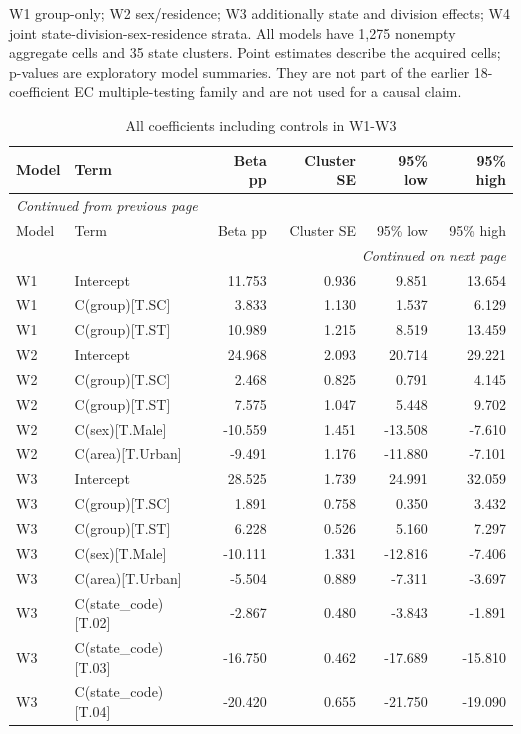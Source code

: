 \documentclass[11pt,a4paper]{report}
\begin{document}
W1 group-only; W2 sex/residence; W3 additionally state and division effects; W4 joint state-division-sex-residence strata. All models have 1,275 nonempty aggregate cells and 35 state clusters. Point estimates describe the acquired cells; p-values are exploratory model summaries. They are not part of the earlier 18-coefficient EC multiple-testing family and are not used for a causal claim.
\begingroup\footnotesize\setlength{\tabcolsep}{4pt}
\begin{longtable}{l>{\raggedright\arraybackslash}p{6cm}rrrr}
\caption{All coefficients including controls in W1-W3}\\\toprule
Model & Term & Beta pp & Cluster SE & 95\% low & 95\% high \\\midrule\endfirsthead
\multicolumn{6}{l}{\textit{Continued from previous page}}\\\toprule
Model & Term & Beta pp & Cluster SE & 95\% low & 95\% high \\\midrule\endhead
\midrule\multicolumn{6}{r}{\textit{Continued on next page}}\\\endfoot\bottomrule\endlastfoot
W1 & Intercept & 11.753 & 0.936 & 9.851 & 13.654 \\
W1 & C(group)[T.SC] & 3.833 & 1.130 & 1.537 & 6.129 \\
W1 & C(group)[T.ST] & 10.989 & 1.215 & 8.519 & 13.459 \\
W2 & Intercept & 24.968 & 2.093 & 20.714 & 29.221 \\
W2 & C(group)[T.SC] & 2.468 & 0.825 & 0.791 & 4.145 \\
W2 & C(group)[T.ST] & 7.575 & 1.047 & 5.448 & 9.702 \\
W2 & C(sex)[T.Male] & -10.559 & 1.451 & -13.508 & -7.610 \\
W2 & C(area)[T.Urban] & -9.491 & 1.176 & -11.880 & -7.101 \\
W3 & Intercept & 28.525 & 1.739 & 24.991 & 32.059 \\
W3 & C(group)[T.SC] & 1.891 & 0.758 & 0.350 & 3.432 \\
W3 & C(group)[T.ST] & 6.228 & 0.526 & 5.160 & 7.297 \\
W3 & C(sex)[T.Male] & -10.111 & 1.331 & -12.816 & -7.406 \\
W3 & C(area)[T.Urban] & -5.504 & 0.889 & -7.311 & -3.697 \\
W3 & C(state\_code)[T.02] & -2.867 & 0.480 & -3.843 & -1.891 \\
W3 & C(state\_code)[T.03] & -16.750 & 0.462 & -17.689 & -15.810 \\
W3 & C(state\_code)[T.04] & -20.420 & 0.655 & -21.750 & -19.090 \\

\end{longtable}
\end{document}
